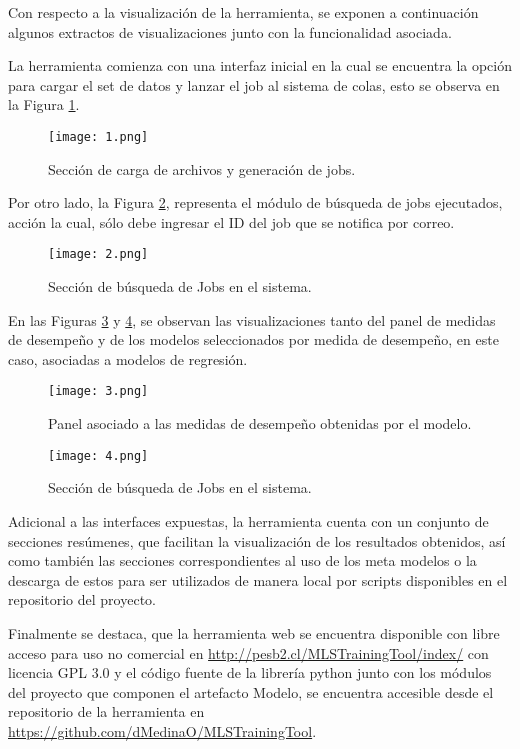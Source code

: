 Con respecto a la visualización de la herramienta, se exponen a continuación algunos extractos de visualizaciones junto con la funcionalidad asociada.

La herramienta comienza con una interfaz inicial en la cual se encuentra la opción para cargar el set de datos y lanzar el job al sistema de colas, esto se observa en la Figura \ref{fig:h1}.

\begin{figure}[!h]
	\centering
	\texttt{[image: 1.png]}
		\caption{Sección de carga de archivos y generación de jobs.}
	\label{fig:h1}
\end{figure}

Por otro lado, la Figura \ref{fig:h2}, representa el módulo de búsqueda de jobs ejecutados, acción la cual, sólo debe ingresar el ID del job que se notifica por correo.

\begin{figure}[!h]
	\centering
	\texttt{[image: 2.png]}
	\caption{Sección de búsqueda de Jobs en el sistema.}
	\label{fig:h2}
\end{figure}

En las Figuras \ref{fig:h3} y \ref{fig:h4}, se observan las visualizaciones tanto del panel de medidas de desempeño y de los modelos seleccionados por medida de desempeño, en este caso, asociadas a modelos de regresión.

\begin{figure}[!h]
	\centering
	\texttt{[image: 3.png]}
	\caption{Panel asociado a las medidas de desempeño obtenidas por el modelo.}
	\label{fig:h3}
\end{figure}

\begin{figure}[!h]
	\centering
	\texttt{[image: 4.png]}
	\caption{Sección de búsqueda de Jobs en el sistema.}
	\label{fig:h4}
\end{figure}

Adicional a las interfaces expuestas, la herramienta cuenta con un conjunto de secciones resúmenes, que facilitan la visualización de los resultados obtenidos, así como también las secciones correspondientes al uso de los meta modelos o la descarga de estos para ser utilizados de manera local por scripts disponibles en el repositorio del proyecto.

Finalmente se destaca, que la herramienta web se encuentra disponible con libre acceso para uso no comercial en \url{http://pesb2.cl/MLSTrainingTool/index/} con licencia GPL 3.0 y el código fuente de la librería python junto con los módulos del proyecto que componen el artefacto Modelo, se encuentra accesible desde el repositorio de la herramienta en \url{https://github.com/dMedinaO/MLSTrainingTool}.

